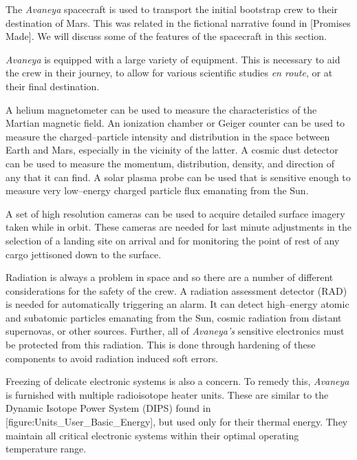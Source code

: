 

The {\it Avaneya} spacecraft is used to transport the initial bootstrap crew to their destination of Mars. This was related in the fictional narrative found in [Promises Made]. We will discuss some of the features of the spacecraft in this section.

{\it Avaneya} is equipped with a large variety of equipment. This is necessary to aid the crew in their journey, to allow for various scientific studies {\it en route}, or at their final destination.

A helium magnetometer can be used to measure the characteristics of the Martian magnetic field. An ionization chamber or Geiger counter can be used to measure the charged--particle intensity and distribution in the space between Earth and Mars, especially in the vicinity of the latter. A cosmic dust detector can be used to measure the momentum, distribution, density, and direction of any that it can find. A solar plasma probe can be used that is sensitive enough to measure very low--energy charged particle flux emanating from the Sun.

A set of high resolution cameras can be used to acquire detailed surface imagery taken while in orbit. These cameras are needed for last minute adjustments in the selection of a landing site on arrival and for monitoring the point of rest of any cargo jettisoned down to the surface.

Radiation is always a problem in space and so there are a number of different considerations for the safety of the crew. A radiation assessment detector (RAD) is needed for automatically triggering an alarm. It can detect high--energy atomic and subatomic particles emanating from the Sun, cosmic radiation from distant supernovas, or other sources. Further, all of {\it Avaneya's} sensitive electronics must be protected from this radiation. This is done through hardening of these components to avoid radiation induced soft errors.

Freezing of delicate electronic systems is also a concern. To remedy this, {\it Avaneya} is furnished with multiple radioisotope heater units. These are similar to the Dynamic Isotope Power System (DIPS) found in [figure:Units_User_Basic_Energy], but used only for their thermal energy. They maintain all critical electronic systems within their optimal operating temperature range.


